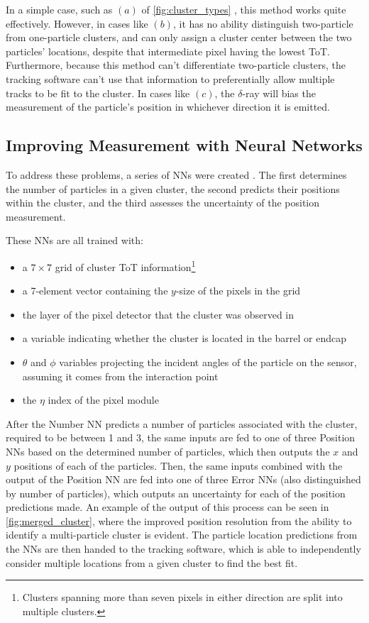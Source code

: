 In a simple case, such as $(a)$ of \autoref{fig:cluster_types} , this method works quite effectively. However, in cases like $(b)$, it has no ability distinguish two-particle from one-particle clusters, and can only assign a cluster center between the two particles' locations, despite that intermediate pixel having the lowest \ac{ToT}. Furthermore, because this method can't differentiate two-particle clusters, the tracking software can't use that information to preferentially allow multiple tracks to be fit to the cluster. In cases like $(c)$, the $\delta$-ray will bias the measurement of the particle's position in whichever direction it is emitted. 

\subsection{Improving Measurement with Neural Networks}

To address these problems, a series of \acp{NN} were created \cite{PERF-2012-05}. The first determines the number of particles in a given cluster, the second predicts their positions within the cluster, and the third assesses the uncertainty of the position measurement. 

These \acp{NN} are all trained with: 
\begin{itemize}
\item a $7\times7$ grid of cluster \ac{ToT} information\footnote{Clusters spanning more than seven pixels in either direction are split into multiple clusters.}
\item a 7-element vector containing the $y$-size of the pixels in the grid
\item the layer of the pixel detector that the cluster was observed in
\item a variable indicating whether the cluster is located in the barrel or endcap
\item $\theta$ and $\phi$ variables projecting the incident angles of the particle on the sensor, assuming it comes from the interaction point 
\item the $\eta$ index of the pixel module
\end{itemize}

After the Number \ac{NN} predicts a number of particles associated with the cluster, required to be between 1 and 3, the same inputs are fed to one of three Position \acp{NN} based on the determined number of particles, which then outputs the $x$ and $y$ positions of each of the particles. Then, the same inputs combined with the output of the Position \ac{NN} are fed into one of three Error \acp{NN} (also distinguished by number of particles), which outputs an uncertainty for each of the position predictions made. An example of the output of this process can be seen in \autoref{fig:merged_cluster}, where the improved position resolution from the ability to identify a multi-particle cluster is evident. The particle location predictions from the \acp{NN} are then handed to the tracking software, which is able to independently consider multiple locations from a given cluster to find the best fit. 

